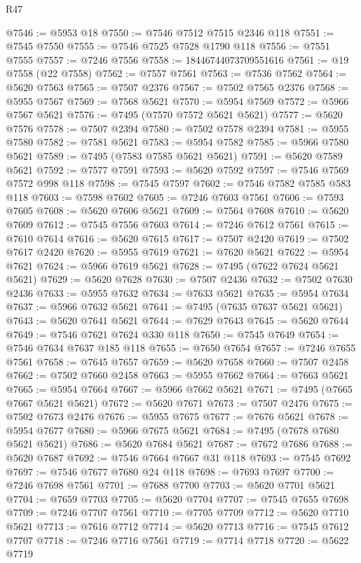 \begin{lexlean}{R47}
\begin{coremodule}
@7546 := @5953 @18
@7550 := @7546 @7512 @7515 @2346 @118
@7551 := @7545 @7550
@7555 := @7546 @7525 @7528 @1790 @118
@7556 := @7551 @7555
@7557 := @7246 @7556
@7558 := 18446744073709551616
@7561 := @19 @7558 (@22 @7558)
@7562 := @7557 @7561
@7563 := @7536 @7562
@7564 := @5620 @7563
@7565 := @7507 @2376
@7567 := @7502 @7565 @2376
@7568 := @5955 @7567
@7569 := @7568 @5621
@7570 := @5954 @7569
@7572 := @5966 @7567 @5621
@7576 := @7495 (@7570 @7572 @5621 @5621)
@7577 := @5620 @7576
@7578 := @7507 @2394
@7580 := @7502 @7578 @2394
@7581 := @5955 @7580
@7582 := @7581 @5621
@7583 := @5954 @7582
@7585 := @5966 @7580 @5621
@7589 := @7495 (@7583 @7585 @5621 @5621)
@7591 := @5620 @7589 @5621
@7592 := @7577 @7591
@7593 := @5620 @7592
@7597 := @7546 @7569 @7572 @998 @118
@7598 := @7545 @7597
@7602 := @7546 @7582 @7585 @583 @118
@7603 := @7598 @7602
@7605 := @7246 @7603 @7561
@7606 := @7593 @7605
@7608 := @5620 @7606 @5621
@7609 := @7564 @7608
@7610 := @5620 @7609
@7612 := @7545 @7556 @7603
@7614 := @7246 @7612 @7561
@7615 := @7610 @7614
@7616 := @5620 @7615
@7617 := @7507 @2420
@7619 := @7502 @7617 @2420
@7620 := @5955 @7619
@7621 := @7620 @5621
@7622 := @5954 @7621
@7624 := @5966 @7619 @5621
@7628 := @7495 (@7622 @7624 @5621 @5621)
@7629 := @5620 @7628
@7630 := @7507 @2436
@7632 := @7502 @7630 @2436
@7633 := @5955 @7632
@7634 := @7633 @5621
@7635 := @5954 @7634
@7637 := @5966 @7632 @5621
@7641 := @7495 (@7635 @7637 @5621 @5621)
@7643 := @5620 @7641 @5621
@7644 := @7629 @7643
@7645 := @5620 @7644
@7649 := @7546 @7621 @7624 @330 @118
@7650 := @7545 @7649
@7654 := @7546 @7634 @7637 @185 @118
@7655 := @7650 @7654
@7657 := @7246 @7655 @7561
@7658 := @7645 @7657
@7659 := @5620 @7658
@7660 := @7507 @2458
@7662 := @7502 @7660 @2458
@7663 := @5955 @7662
@7664 := @7663 @5621
@7665 := @5954 @7664
@7667 := @5966 @7662 @5621
@7671 := @7495 (@7665 @7667 @5621 @5621)
@7672 := @5620 @7671
@7673 := @7507 @2476
@7675 := @7502 @7673 @2476
@7676 := @5955 @7675
@7677 := @7676 @5621
@7678 := @5954 @7677
@7680 := @5966 @7675 @5621
@7684 := @7495 (@7678 @7680 @5621 @5621)
@7686 := @5620 @7684 @5621
@7687 := @7672 @7686
@7688 := @5620 @7687
@7692 := @7546 @7664 @7667 @31 @118
@7693 := @7545 @7692
@7697 := @7546 @7677 @7680 @24 @118
@7698 := @7693 @7697
@7700 := @7246 @7698 @7561
@7701 := @7688 @7700
@7703 := @5620 @7701 @5621
@7704 := @7659 @7703
@7705 := @5620 @7704
@7707 := @7545 @7655 @7698
@7709 := @7246 @7707 @7561
@7710 := @7705 @7709
@7712 := @5620 @7710 @5621
@7713 := @7616 @7712
@7714 := @5620 @7713
@7716 := @7545 @7612 @7707
@7718 := @7246 @7716 @7561
@7719 := @7714 @7718
@7720 := @5622 @7719

\end{coremodule}
\end{lexlean}

